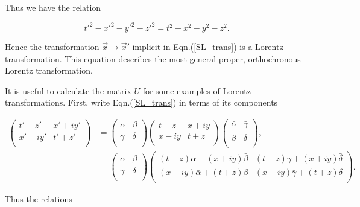\noindent Thus we have the relation

\begin{equation*}  
{t'}^2 - {x'}^2 - {y'}^2 - {z'}^2 = {t}^2 - {x}^2 - {y}^2 - {z}^2.
\end{equation*}

\noindent Hence the transformation $\vec{x} \rightarrow \vec{x}'$ implicit in Eqn.(\ref{SL_trans}) is a Lorentz transformation. This equation describes the most general proper, orthochronous Lorentz transformation.

It is useful to calculate the matrix $U$ for some examples of Lorentz transformations. First, write Eqn.(\ref{SL_trans}) in terms of its components

\begin{align*} 
\left(
\begin{array}{cc}
t' - z' & x' + i y' \\
x' - i y' & t' + z' \\
\end{array}
\right)
& =
\left(
\begin{array}{cc}
\alpha & \beta \\
\gamma & \delta \\
\end{array}
\right)
\left(
\begin{array}{cc}
t-z & x + i y \\
x - i y & t + z   \\
\end{array}
\right)
\left(
\begin{array}{cc}
\bar{\alpha} & \bar{\gamma} \\
\bar{\beta} & \bar{\delta} \\
\end{array}
\right), \\
& = \left(
\begin{array}{cc}
\alpha & \beta \\
\gamma & \delta \\
\end{array}
\right)
\left(
\begin{array}{cc}
(t-z)\bar{\alpha} + (x + iy)\bar{\beta} & (t-z)\bar{\gamma} + (x + iy)\bar{\delta} \\
(x - iy)\bar{\alpha} + (t+z)\bar{\beta} & (x-iy)\bar{\gamma} + (t+z)\bar{\delta} \\
\end{array}
\right).
\end{align*}

\noindent Thus the relations

